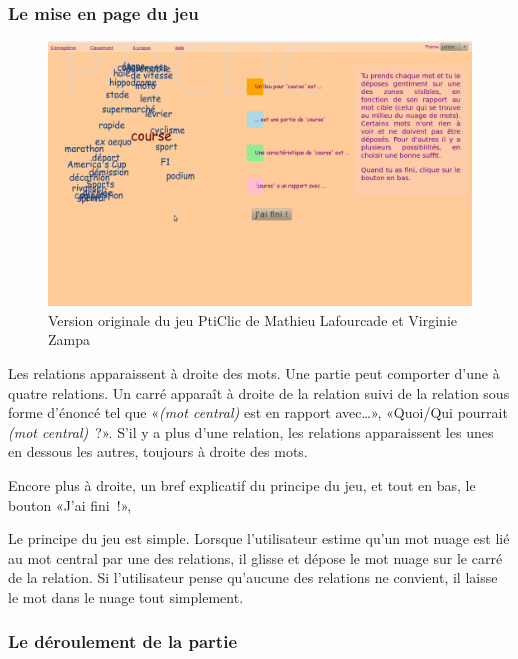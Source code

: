 \documentclass[a4paper,11pt,french]{article}
\begin{document}
\subsubsection{Le mise en page du jeu}

\begin{figure}[h!]
  \centering
\includegraphics[width=14cm]{img/PtiClicJeu.png}
 \caption{Version originale du jeu PtiClic de Mathieu Lafourcade et Virginie Zampa}
\end{figure}

Les relations apparaissent à droite des mots. Une partie peut comporter d'une à quatre relations. Un carré apparaît à droite de la relation suivi de la relation sous forme d'énoncé tel que «\emph{(mot central)} est en rapport avec\dots{}», «Quoi/Qui pourrait \emph{(mot central)}~?». S'il y a plus d'une relation, les relations apparaissent les unes en dessous les autres, toujours à droite des mots.

Encore plus à droite, un bref explicatif du principe du jeu, et tout en bas, le bouton «J'ai fini~!», 

Le principe du jeu est simple. Lorsque l'utilisateur estime qu'un mot nuage est lié au mot central par une des relations, il glisse et dépose le mot nuage sur le carré de la relation. Si l'utilisateur pense qu'aucune des relations ne convient, il laisse le mot dans le nuage tout simplement. 

\subsubsection{Le déroulement de la partie}
\end{document}

